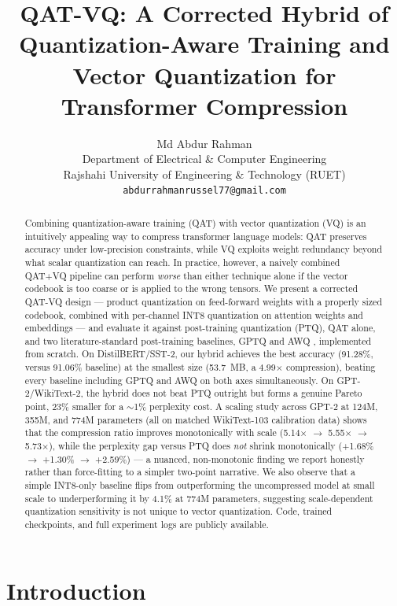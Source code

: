 \documentclass[11pt]{article}
\title{\textbf{QAT-VQ: A Corrected Hybrid of Quantization-Aware Training and\\
Vector Quantization for Transformer Compression}}
\author{
  Md Abdur Rahman \\
  Department of Electrical \& Computer Engineering \\
  Rajshahi University of Engineering \& Technology (RUET) \\
  \texttt{abdurrahmanrussel77@gmail.com}
}
\date{}
\begin{document}
\maketitle

\begin{abstract}
Combining quantization-aware training (QAT) with vector quantization (VQ) is
an intuitively appealing way to compress transformer language models: QAT
preserves accuracy under low-precision constraints, while VQ exploits weight
redundancy beyond what scalar quantization can reach. In practice, however,
a naively combined QAT+VQ pipeline can perform \emph{worse} than either
technique alone if the vector codebook is too coarse or is applied to the
wrong tensors. We present a corrected QAT-VQ design --- product
quantization on feed-forward weights with a properly sized codebook,
combined with per-channel INT8 quantization on attention weights and
embeddings --- and evaluate it against post-training quantization (PTQ),
QAT alone, and two literature-standard post-training baselines, GPTQ
\citep{frantar2023gptq} and AWQ \citep{lin2024awq}, implemented from
scratch. On DistilBERT/SST-2, our hybrid achieves the best accuracy
(91.28\%, versus 91.06\% baseline) at the smallest size (53.7~MB, a
4.99$\times$ compression), beating every baseline including GPTQ and AWQ
on both axes simultaneously. On GPT-2/WikiText-2, the hybrid does not beat
PTQ outright but forms a genuine Pareto point, 23\% smaller for a
$\sim$1\% perplexity cost. A scaling study across GPT-2 at 124M, 355M, and
774M parameters (all on matched WikiText-103 calibration data) shows that
the compression ratio improves monotonically with scale (5.14$\times$
$\rightarrow$ 5.55$\times$ $\rightarrow$ 5.73$\times$), while the
perplexity gap versus PTQ does \emph{not} shrink monotonically
(+1.68\% $\rightarrow$ +1.30\% $\rightarrow$ +2.59\%) --- a nuanced,
non-monotonic finding we report honestly rather than force-fitting to a
simpler two-point narrative. We also observe that a simple INT8-only
baseline flips from outperforming the uncompressed model at small scale to
underperforming it by 4.1\% at 774M parameters, suggesting scale-dependent
quantization sensitivity is not unique to vector quantization. Code,
trained checkpoints, and full experiment logs are publicly available.
\end{abstract}

\section{Introduction}
\end{document}
